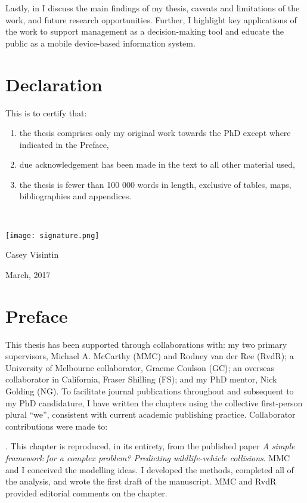 \documentclass[titlesmallcaps,copyrightpage,examinerscopy]{uomthesis}
\begin{document}
Lastly, in  I discuss the main findings of my thesis, caveats and limitations of the work, and future research opportunities. Further, I highlight key applications of the work to support management as a decision-making tool and educate the public as a mobile device-based information system.

\chapter{Declaration}
This is to certify that:
{\renewcommand{\theenumi}{\roman{enumi}}%
\begin{enumerate}
 \item the thesis comprises only my original work towards the PhD except where indicated in the Preface,
 \item due acknowledgement has been made in the text to all other material used,
 \item the thesis is fewer than 100 000 words in length, exclusive of tables, maps, bibliographies and appendices.
\end{enumerate}
}
\hrulefill \\

\begin{flushright} 
\texttt{[image: signature.png]}

Casey Visintin

March, 2017
\end{flushright}

\chapter{Preface}
This thesis has been supported through collaborations with: my two primary supervisors, Michael A. McCarthy (MMC) and Rodney van der Ree (RvdR); a University of Melbourne collaborator, Graeme Coulson (GC); an overseas collaborator in California, Fraser Shilling (FS); and my PhD mentor, Nick Golding (NG). To facilitate journal publications throughout and subsequent to my PhD candidature, I have written the chapters using the collective first-person plural ``we'', consistent with current academic publishing practice. Collaborator contributions were made to:

. This chapter is reproduced, in its entirety, from the published paper \textit{A simple framework for a complex problem?  Predicting wildlife-vehicle collisions}. MMC and I conceived the modelling ideas. I developed the methods, completed all of the analysis, and wrote the first draft of the manuscript. MMC and RvdR provided editorial comments on the chapter.
\end{document}
